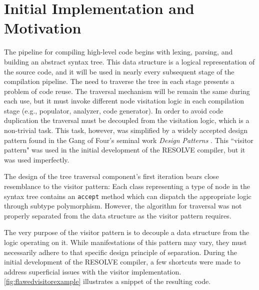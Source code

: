 \documentclass[times]{speauth}
\begin{document}
\section{Initial Implementation and Motivation}
The pipeline for compiling high-level code begins with lexing, parsing, and building an abstract syntax tree. This data structure is a logical representation of the source code, and it will be used in nearly every subsequent stage of the compilation pipeline. The need to traverse the tree in each stage presents a problem of code reuse. The traversal mechanism will be remain the same during each use, but it must invoke different node visitation logic in each compilation stage (e.g., populator, analyzer, code generator). In order to avoid code duplication the traversal must be decoupled from the visitation logic, which is a non-trivial task. This task, however, was simplified by a widely accepted design pattern found in the Gang of Four's seminal work \textit{Design Patterns} \cite{gamma:1995}. This ``visitor pattern" was used in the initial development of the RESOLVE compiler, but it was used imperfectly.

The design of the tree traversal component's first iteration bears close resemblance to the visitor pattern: Each class representing a type of node in the syntax tree contains an \texttt{accept} method which can dispatch the appropriate logic through subtype polymorphism. However, the algorithm for traversal was not properly separated from the data structure as the visitor pattern requires.

The very purpose of the visitor pattern is to decouple a data structure from the logic operating on it. While manifestations of this pattern may vary, they must necessarily adhere to that specific design principle of separation. During the initial development of the RESOLVE compiler, a few shortcuts were made to address superficial issues with the visitor implementation. \ref{fig:flawedvisitorexample} illustrates a snippet of the resulting code.
\end{document}
